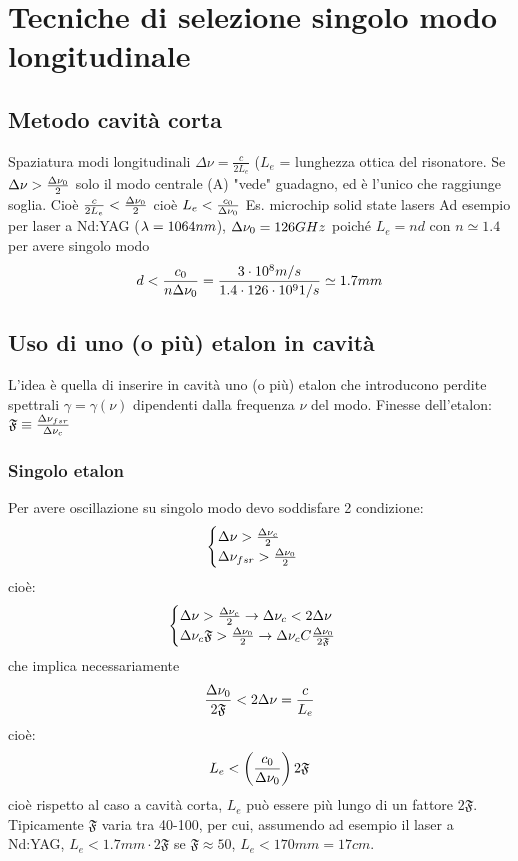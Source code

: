 \section{Tecniche di selezione singolo modo longitudinale}
\subsection{Metodo cavità corta}
Spaziatura modi longitudinali $\Delta \nu = \frac{c}{2L_e}$ ($L_e$ = lunghezza ottica del risonatore.
Se $\Delta \nu > \frac{\Delta \nu_0}{2}$ solo il modo centrale (A) "vede" guadagno, ed è l'unico che raggiunge soglia. Cioè $\frac{c}{2L_e} < \frac{\Delta \nu_0}{2}$ cioè $L_e < \frac{c_0}{\Delta \nu_0}$
Es. microchip solid state lasers
Ad esempio per laser a Nd:YAG ($\lambda = 1064 nm$), $\Delta \nu_0 = 126 GHz$ poiché $L_e = nd$ con $n \simeq 1.4$ per avere singolo modo
\begin{equation*}
d < \frac{c_0}{n \Delta \nu_0} = \frac{3\cdot 10^8 m/s}{1.4 \cdot 126 \cdot 10^9 1/s} \simeq 1.7 mm
\end{equation*}

\subsection{Uso di uno (o più) etalon in cavità}
L'idea è quella di inserire in cavità uno (o più) etalon che introducono perdite spettrali $\gamma = \gamma(\nu)$ dipendenti dalla frequenza $\nu$ del modo.
Finesse dell'etalon: $\mathfrak{F} \equiv \frac{\Delta \nu_{fsr}}{\Delta \nu_c}$
\subsubsection{Singolo etalon}
Per avere oscillazione su singolo modo devo soddisfare 2 condizione:
\begin{equation*}
\begin{cases}
\Delta \nu > \frac{\Delta \nu_c}{2}\\
\Delta \nu_{fsr} > \frac{\Delta \nu_0}{2}
\end{cases}
\end{equation*}
cioè:
\begin{equation*}
\begin{cases}
\Delta \nu > \frac{\Delta \nu_c}{2} \rightarrow \Delta\nu_c < 2\Delta\nu\\
\Delta \nu_c \mathfrak{F} > \frac{\Delta \nu_0}{2} \rightarrow \Delta \nu_c C \frac{\Delta\nu_0}{2\mathfrak{F}}
\end{cases}
\end{equation*}
che implica necessariamente
\begin{equation*}
\frac{\Delta \nu_0}{2 \mathfrak{F}} < 2\Delta\nu = \frac{c}{L_e}
\end{equation*}
cioè:
\begin{equation*}
L_e < \left(\frac{c_0}{\Delta\nu_0}\right) 2\mathfrak{F}
\end{equation*}
cioè rispetto al caso a cavità corta, $L_e$ può essere più lungo di un fattore $2\mathfrak{F}$. Tipicamente $\mathfrak{F}$ varia tra 40-100, per cui, assumendo ad esempio il laser a Nd:YAG, $L_e < 1.7 mm \cdot 2\mathfrak{F}$ se $\mathfrak{F} \approx 50$, $L_e < 170 mm = 17 cm$.
